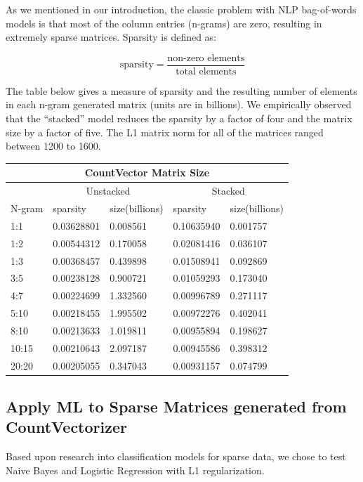 \documentclass[11pt]{article}
\newcommand{\vertSpace}[1]{\vspace{3mm}}
\begin{document}
{As we mentioned in our introduction, the classic problem with NLP bag-of-words models is that most of the column entries (n-grams) are zero, resulting in extremely sparse matrices.  
Sparsity is defined as:

$$\mbox{sparsity} = \frac{\mbox{non-zero elements}}{\mbox{total elements}}$$


The table below gives a measure of sparsity  and the resulting number of elements in each n-gram generated matrix (units are in billions).  We empirically observed that the ``stacked'' model reduces the sparsity by a factor of four and the matrix size by a factor of five. The L1 matrix norm for all of the matrices ranged between 1200 to 1600.\\

\noindent 
\begin{center}
\begin{tabular}{ |p{2cm}||p{2cm}|p{2cm}|p{2cm}|p{2cm}|  }
 \hline
 \multicolumn{5}{|c|}{CountVector Matrix Size} \\
 \hline
 \multicolumn{1}{|c|}{} &
 \multicolumn{2}{|c|}{Unstacked} &
 \multicolumn{2}{|c|}{Stacked}\\
 \hline
 N-gram & sparsity & size(billions) & sparsity & size(billions)\\
 \hline
       1:1& 0.03628801& 0.008561&  0.10635940&   0.001757 \\
       1:2& 0.00544312& 0.170058&  0.02081416&    0.036107\\
       1:3& 0.00368457& 0.439898&  0.01508941&     0.092869\\
       3:5& 0.00238128& 0.900721&  0.01059293&     0.173040\\
       4:7& 0.00224699& 1.332560&  0.00996789&     0.271117\\
      5:10& 0.00218455& 1.995502&  0.00972276&     0.402041\\
      8:10& 0.00213633& 1.019811&  0.00955894&     0.198627\\
     10:15& 0.00210643& 2.097187&  0.00945586&     0.398312\\
     20:20& 0.00205055& 0.347043&  0.00931157&     0.074799\\
 \hline
\end{tabular}
\end{center}




\subsection{Apply ML to Sparse Matrices generated from CountVectorizer}
\noindent
Based upon research into classification models for sparse data, we chose to test Naive Bayes and Logistic Regression with L1 regularization.  \vertSpace

}
\end{document}
